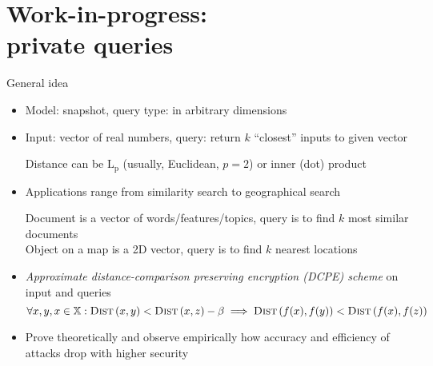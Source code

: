 \section{Work-in-progress: \\ private \knn{} queries}

	\begin{frame}{General idea}

		\begin{itemize}
			\item<1->
				Model: \alert{snapshot}, query type: \alert{\knn{}} in arbitrary dimensions

			\item<2->
				Input: vector of real numbers, query: return $k$ ``closest'' inputs to given vector \\
				\begin{small}
					Distance can be $\text{L}_\text{p}$ (usually, Euclidean, $p = 2$) or inner (dot) product
				\end{small}

			\item<3->
				Applications range from similarity search to geographical search \\
				\begin{small}
					Document is a vector of words/features/topics, query is to find $k$ most similar documents \\
					Object on a map is a 2D vector, query is to find $k$ nearest locations
				\end{small}

			\item<4->
				\emph{Approximate distance-comparison preserving encryption (DCPE) scheme} on input and queries
				\[
					\forall x, y, x \in \mathbb{X} : \algo{Dist}{x, y} < \algo{Dist}{x, z} - \beta \implies \algo{Dist}{f(x), f(y)} < \algo{Dist}{f(x), f(z)}
				\]

			\item<5->
				Prove theoretically and observe empirically how accuracy and efficiency of attacks drop with higher security
		\end{itemize}

	\end{frame}

